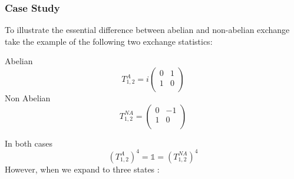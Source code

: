 \documentclass[Master]{subfiles}
\begin{document}
\subsubsection{Case Study}\label{sec:AnyonsCaseStudy}
To illustrate the essential difference between abelian and non-abelian exchange take the example of the following two exchange statistics:\\
\begin{center}
Abelian
\begin{dmath}
T^A_{1,2}=i\left(
\begin{array}{cc}
 0 & 1  \\
 1  & 0 \\
\end{array}
\right)
\end{dmath}
Non Abelian 
\begin{dmath}
T^{NA}_{1,2}=\left(
\begin{array}{cc}
 0 & -1  \\
 1  & 0 \\
\end{array}
\right)
\end{dmath}
\end{center} 
In both cases 
\begin{equation}\label{eq:ExPeriodicity}
 (T^A_{1,2})^4 = \mathbb{1} = (T^{NA}_{1,2})^4
\end{equation}
However, when we expand to three states :
\end{document}
